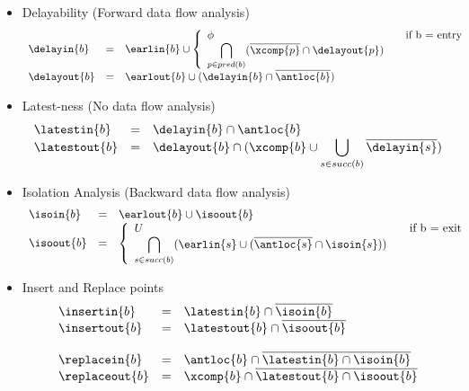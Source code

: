 \begin{itemize}
\item Delayability (Forward data flow analysis)
\begin{equation}
\begin{array}{l c l}
\delayin{b} &=& \earlin{b} \cup  \left\{
                              \begin{array}{l l}
                                \phi & \quad \text{if b = entry}\\
                                \displaystyle \bigcap_{p \in pred(b)} (\overline{\xcomp{p}} \cap \delayout{p}) & 
                  \end{array} 
              \right. \\
\delayout{b} &=& \earlout{b} \cup (\delayin{b} \cap \overline{\antloc{b}}) \\
\end{array}
\end{equation}

\item Latest-ness (No data flow analysis)
\begin{equation}
\begin{array}{l c l}
\latestin{b}  &=& \delayin{b} \cap \antloc{b}\\
\latestout{b} &=& \delayout{b} \cap (\xcomp{b} \cup \displaystyle \bigcup_{s \in succ(b)} \overline{\delayin{s}})
\end{array}
\end{equation}


\item Isolation Analysis (Backward data flow analysis)
\begin{equation}
\begin{array}{l c l}
\isoin{b} &=& \earlout{b} \cup \isoout{b} \\
\isoout{b} &=& \left\{
                    \begin{array}{l l}
                        U & \quad \text{if b = exit}\\
                        \displaystyle \bigcap_{s \in succ(b)} (\earlin{s} \cup (\overline{\antloc{s}} \cap \isoin{s}) )&
                    \end{array} \right. \\
\end{array}
\end{equation}

\item Insert and Replace points
\begin{equation}
\begin{array}{l c l}
\insertin{b} &=& \latestin{b} \cap \overline{\isoin{b}} \\
\insertout{b} &=& \latestout{b} \cap \overline{\isoout{b}} \\
&&\\
\replacein{b} &=& \antloc{b} \cap \overline{\latestin{b} \cap \isoin{b}} \\
\replaceout{b} &=& \xcomp{b} \cap \overline{\latestout{b} \cap \isoout{b}}
\end{array}
\end{equation}
\end{itemize}

